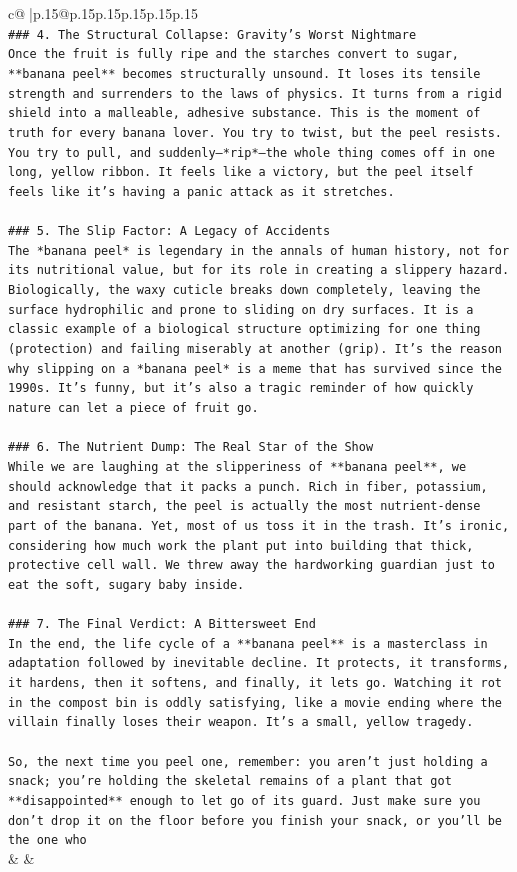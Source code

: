 \documentclass{article}
\begin{document}
{\begin{supertabular}{c@{$\;$}|p{.15\linewidth}@{}p{.15\linewidth}p{.15\linewidth}p{.15\linewidth}p{.15\linewidth}p{.15\linewidth}}
{{{\\ 
\texttt{\#\#\# 4. The Structural Collapse: Gravity's Worst Nightmare} \\
\texttt{Once the fruit is fully ripe and the starches convert to sugar, **banana peel** becomes structurally unsound. It loses its tensile strength and surrenders to the laws of physics. It turns from a rigid shield into a malleable, adhesive substance. This is the moment of truth for every banana lover. You try to twist, but the peel resists. You try to pull, and suddenly—*rip*—the whole thing comes off in one long, yellow ribbon. It feels like a victory, but the peel itself feels like it's having a panic attack as it stretches.} \\
\\ 
\texttt{\#\#\# 5. The Slip Factor: A Legacy of Accidents} \\
\texttt{The *banana peel* is legendary in the annals of human history, not for its nutritional value, but for its role in creating a slippery hazard. Biologically, the waxy cuticle breaks down completely, leaving the surface hydrophilic and prone to sliding on dry surfaces. It is a classic example of a biological structure optimizing for one thing (protection) and failing miserably at another (grip). It's the reason why slipping on a *banana peel* is a meme that has survived since the 1990s. It's funny, but it's also a tragic reminder of how quickly nature can let a piece of fruit go.} \\
\\ 
\texttt{\#\#\# 6. The Nutrient Dump: The Real Star of the Show} \\
\texttt{While we are laughing at the slipperiness of **banana peel**, we should acknowledge that it packs a punch. Rich in fiber, potassium, and resistant starch, the peel is actually the most nutrient{-}dense part of the banana. Yet, most of us toss it in the trash. It's ironic, considering how much work the plant put into building that thick, protective cell wall. We threw away the hardworking guardian just to eat the soft, sugary baby inside.} \\
\\ 
\texttt{\#\#\# 7. The Final Verdict: A Bittersweet End} \\
\texttt{In the end, the life cycle of a **banana peel** is a masterclass in adaptation followed by inevitable decline. It protects, it transforms, it hardens, then it softens, and finally, it lets go. Watching it rot in the compost bin is oddly satisfying, like a movie ending where the villain finally loses their weapon. It's a small, yellow tragedy.} \\
\\ 
\texttt{So, the next time you peel one, remember: you aren't just holding a snack; you're holding the skeletal remains of a plant that got **disappointed** enough to let go of its guard. Just make sure you don't drop it on the floor before you finish your snack, or you'll be the one who} \\
            }
        }
    }
    & & \\ \\


\end{supertabular}}
\end{document}
